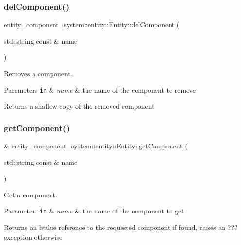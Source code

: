 \subsubsection{del\+Component()}
{\footnotesize{} entity\+\_\+component\+\_\+system\+::entity\+::\+Entity\+::del\+Component (\begin{DoxyParamCaption}\item[{std\+::string const \&}]{name }\end{DoxyParamCaption})\hspace{0.3cm}{\ttfamily [inline]}}



Removes a component. 


\begin{DoxyParams}[1]{Parameters}
\mbox{\tt in}  & {\em name} & the name of the component to remove \\
\hline
\end{DoxyParams}
\begin{DoxyReturn}{Returns}
a shallow copy of the removed component 
\end{DoxyReturn}
\label{classentity__component__system_1_1entity_1_1_entity_a804378afd22dd328a9a2c4f03ae3260e} 
\subsubsection{get\+Component()\hspace{0.1cm}{\footnotesize\ttfamily [1/2]}}
{\footnotesize{}\& entity\+\_\+component\+\_\+system\+::entity\+::\+Entity\+::get\+Component (\begin{DoxyParamCaption}\item[{std\+::string const \&}]{name }\end{DoxyParamCaption})\hspace{0.3cm}{\ttfamily [inline]}}



Get a component. 


\begin{DoxyParams}[1]{Parameters}
\mbox{\tt in}  & {\em name} & the name of the component to get \\
\hline
\end{DoxyParams}
\begin{DoxyReturn}{Returns}
an lvalue reference to the requested component if found, raises an ??? exception otherwise 
\end{DoxyReturn}
\label{classentity__component__system_1_1entity_1_1_entity_ad636ba1c5b1c59eb3cb5cf410ec04385} 

